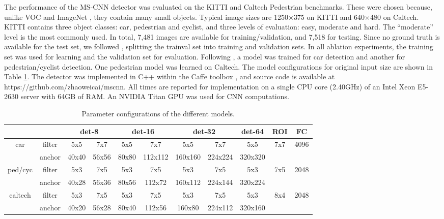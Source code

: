 \documentclass[runningheads]{llncs}
\begin{document}
The performance of the MS-CNN detector was evaluated on the
KITTI \cite{DBLP:conf/cvpr/GeigerLU12}
and Caltech Pedestrian \cite{DBLP:journals/pami/DollarWSP12} benchmarks.
These were chosen because, unlike
VOC \cite{DBLP:journals/ijcv/EveringhamGWWZ10} and ImageNet
\cite{DBLP:journals/ijcv/RussakovskyDSKS15}, they contain many small objects. Typical image sizes are
1250$\times$375 on KITTI and 640$\times$480 on Caltech.
KITTI contains three object classes: car, pedestrian and cyclist, and three
levels of evaluation: easy, moderate and hard. The ``moderate'' level is the most commonly used. In total, 7,481 images are available for training/validation, and 7,518 for testing.
Since no ground truth is available for the test set, we followed
\cite{DBLP:conf/nips/XiaozhiNIPS15}, splitting the trainval set into training and validation sets. In all ablation experiments, the training set was used for learning and the validation set for evaluation. Following \cite{DBLP:conf/nips/XiaozhiNIPS15}, a model was trained for car detection and another for pedestrian/cyclist detection. One pedestrian model was learned on Caltech. The model configurations for original input size are shown in Table \ref{tab:parameters}. The detector was implemented in C++ within the Caffe toolbox \cite{DBLP:conf/mm/JiaSDKLGGD14}, and source code is available at https://github.com/zhaoweicai/mscnn. All times are reported for implementation on a single CPU core (2.40GHz) of an Intel Xeon E5-2630 server with 64GB of RAM. An NVIDIA Titan GPU was used for CNN computations.

\begin{table}[t]
\centering \scriptsize \setlength{\tabcolsep}{3.0pt}
\vspace{0.1cm} \caption{Parameter configurations of the different models.}
\label{tab:parameters}
\begin{tabular}
{c|c||c|c||c|c||c|c||c||c||c}
\multicolumn{2}{c||}{}
&\multicolumn{2}{|c||}{det-8}
&\multicolumn{2}{|c||}{det-16}
&\multicolumn{2}{|c||}{det-32}
&\multicolumn{1}{|c||}{det-64}
&\multicolumn{1}{|c||}{ROI}
&\multicolumn{1}{|c}{FC}\\\hline\hline
\multirow{2}{*}{car} &filter &5x5 &7x7 &5x5 &7x7 &5x5 &7x7 &5x5 &7x7 &4096\\\cline{2-11}
&anchor &40x40 &56x56 &80x80 &112x112 &160x160 &224x224 &320x320 & &\\\hline
\multirow{2}{*}{ped/cyc} &filter &5x3 &7x5 &5x3 &7x5 &5x3 &7x5 &5x3 &7x5 &2048\\\cline{2-11}
&anchor &40x28 &56x36 &80x56 &112x72 &160x112 &224x144 &320x224 & &\\\hline
\multirow{2}{*}{caltech} &filter &5x3 &7x5 &5x3 &7x5 &5x3 &7x5 &5x3 &8x4 &2048\\\cline{2-11}
&anchor &40x20 &56x28 &80x40 &112x56 &160x80 &224x112 &320x160 & &\\\hline
\end{tabular}
\end{table}
\end{document}
